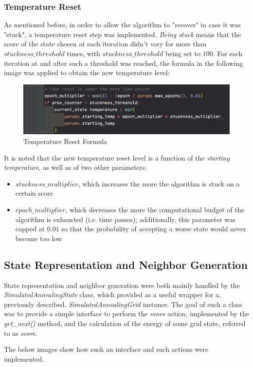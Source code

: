 \subsubsection{Temperature Reset}

As mentioned before, in order to allow the algorithm to "recover" in case it was "stuck", a temperature reset step was implemented. \textit{Being stuck} means that the score of the state chosen at each iteration didn't vary for more than $stuckness\_threshold$ times, with $stuckness\_threshold$ being set to $100$. For each iteration at and after such a threshold was reached, the formula in the following image was applied to obtain the new temperature level:

\begin{figure}[h]
    \centering
    \includegraphics[scale=0.65]{assignment-1/images/sim_ann/main-3-temp-reset.png}
    \caption{Temperature Reset Formula}
    \label{fig:ann_main_3_temp_reset}
\end{figure}

It is noted that the new temperature reset level is a function of the \textit{starting temperature}, as well as of two other parameters:

\begin{itemize}
    \item $stuckness\_multiplier$, which increases the more the algorithm is stuck on a certain score
    \item $epoch\_multiplier$, which decreases the more the computational budget of the algorithm is exhausted (i.e. time passes); additionally, this parameter was capped at $0.01$ so that the probability of accepting a worse state would never become too low
\end{itemize}

\subsection{State Representation and Neighbor Generation}

State representation and neighbor generation were both mainly handled by the \textit{SimulatedAnnealingState} class, which provided as a useful wrapper for a, previously described, \textit{SimulatedAnnealingGrid} instance. The goal of such a class was to provide a simple interface to perform the \textit{move} action, implemented by the \textit{get\_next()} method, and the calculation of the energy of some grid state, referred to as \textit{score}. 
\par
The below images show how such an interface and such actions were implemented.

